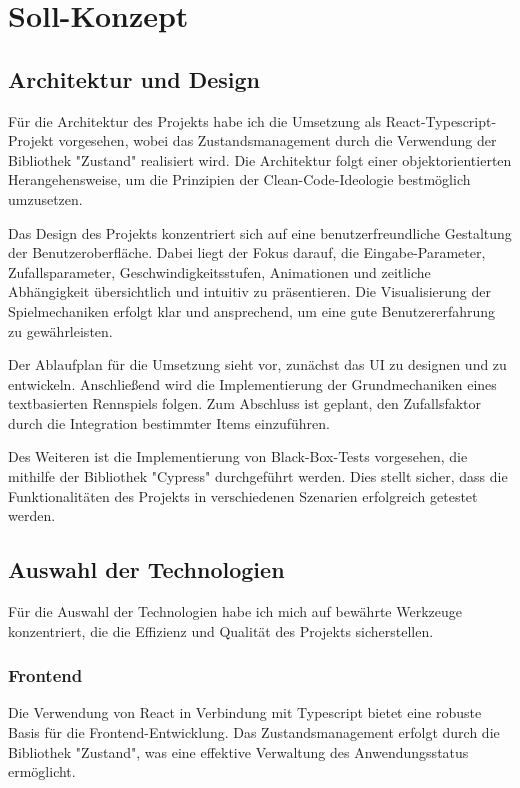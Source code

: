 \documentclass[hidelinks,12pt]{article}
\begin{document}
\section{Soll-Konzept}

\subsection{Architektur und Design}
Für die Architektur des Projekts habe ich die Umsetzung als React-Typescript-Projekt vorgesehen, wobei das Zustandsmanagement durch die Verwendung der Bibliothek "Zustand" realisiert wird. Die Architektur folgt einer objektorientierten Herangehensweise, um die Prinzipien der Clean-Code-Ideologie bestmöglich umzusetzen.

Das Design des Projekts konzentriert sich auf eine benutzerfreundliche Gestaltung der Benutzeroberfläche. Dabei liegt der Fokus darauf, die Eingabe-Parameter, Zufallsparameter, Geschwindigkeitsstufen, Animationen und zeitliche Abhängigkeit übersichtlich und intuitiv zu präsentieren. Die Visualisierung der Spielmechaniken erfolgt klar und ansprechend, um eine gute Benutzererfahrung zu gewährleisten.

Der Ablaufplan für die Umsetzung sieht vor, zunächst das UI zu designen und zu entwickeln. Anschließend wird die Implementierung der Grundmechaniken eines textbasierten Rennspiels folgen. Zum Abschluss ist geplant, den Zufallsfaktor durch die Integration bestimmter Items einzuführen.

Des Weiteren ist die Implementierung von Black-Box-Tests vorgesehen, die mithilfe der Bibliothek "Cypress" durchgeführt werden. Dies stellt sicher, dass die Funktionalitäten des Projekts in verschiedenen Szenarien erfolgreich getestet werden.

\subsection{Auswahl der Technologien}
Für die Auswahl der Technologien habe ich mich auf bewährte Werkzeuge konzentriert, die die Effizienz und Qualität des Projekts sicherstellen.

\subsubsection{Frontend}
Die Verwendung von React in Verbindung mit Typescript bietet eine robuste Basis für die Frontend-Entwicklung. Das Zustandsmanagement erfolgt durch die Bibliothek "Zustand", was eine effektive Verwaltung des Anwendungsstatus ermöglicht.
\end{document}

